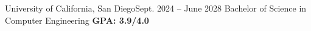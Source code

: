 \resumeSubHeadingListStart
  \resumeSubheading
    {University of California, San Diego}{Sept. 2024 -- June 2028}
    {Bachelor of Science in Computer Engineering}{ \textbf{GPA: 3.9/4.0}}
  \resumeItemListStart
      \vspace{-5pt}
  \resumeItemListEnd
\resumeSubHeadingListEnd
